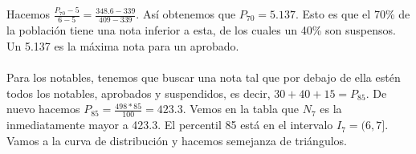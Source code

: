 \documentclass{article}
\begin{document}
    \begin{center}
    \end{center} 
    Hacemos $\frac{P_{70}-5}{6-5}=\frac{348.6-339}{409-339}$. Así obtenemos que $P_{70} = 5.137$. Esto es que el 70\% de la población tiene una nota inferior a esta, de los cuales un 40\% son suspensos. Un 5.137 es la máxima nota para un aprobado. \\ \\
    Para los notables, tenemos que buscar una nota tal que por debajo de ella estén todos los notables, aprobados y suspendidos, es decir, $30+40+15 = P_{85}$. De nuevo hacemos $P_{85}=\frac{498*85}{100}=423.3$. Vemos en la tabla que $N_{7}$ es la inmediatamente mayor a 423.3. El percentil 85 está en el intervalo $I_7 = (6,7]$. Vamos a la curva de distribución y hacemos semejanza de triángulos. \\
    
\end{document}
